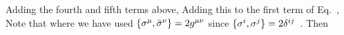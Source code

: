 \documentclass[11pt]{article}
\begin{document}
{	Adding the fourth and fifth terms above,
	Adding this to the first term of Eq.~,
	Note that
	where we have used $\{ \sigma^\mu, \bar{\sigma}^\nu \} = 2 g^{\mu \nu}$ since $\{ \sigma^i, \sigma^j \} = 2 \delta^{i j}$~\cite[p.~165]{Sakurai}.  Then
	
}
\end{document}
